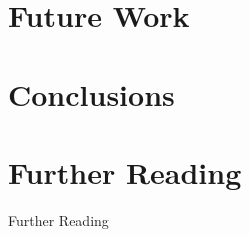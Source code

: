 \documentclass[10pt]{beamer}
\theoremstyle{definition}
\theoremstyle{remark}
\numberwithin{equation}{section}
\begin{document}
\section{Future Work} %

\begin{frame}[fragile]{}
\end{frame}

\begin{frame}[fragile]{}
\end{frame}

\begin{frame}[fragile]{}
\end{frame}

\begin{frame}[fragile]{}
\end{frame}

\section{Conclusions} %

\section{Further Reading}

\begin{frame}[fragile]{Further Reading}

  \nocite{elkins_calculating_2009}
  \nocite{diel:blog}
  \nocite{milewski2014}

  
  

\end{frame}
\end{document}

